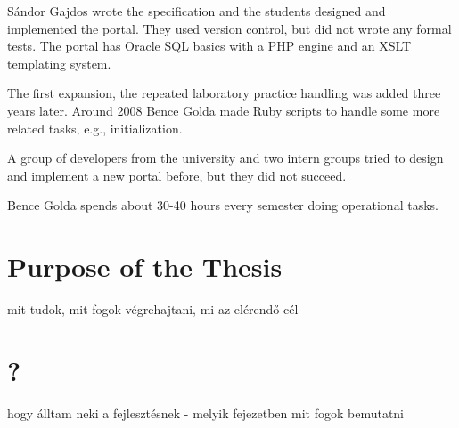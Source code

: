 Sándor Gajdos wrote the specification and the students designed and implemented the portal. They used version control, but did not wrote any formal tests. The portal has Oracle SQL basics with a PHP engine and an XSLT templating system.

The first expansion, the repeated laboratory practice handling was added three years later. Around 2008 Bence Golda made Ruby scripts to handle some more related tasks, e.g., initialization.

A group of developers from the university and two intern groups tried to design and implement a new portal before, but they did not succeed.

Bence Golda spends about 30-40 hours every semester doing operational tasks.

\section{Purpose of the Thesis}
mit tudok, mit fogok végrehajtani, mi az elérendő cél

\section{?}
hogy álltam neki a fejlesztésnek - melyik fejezetben mit fogok bemutatni